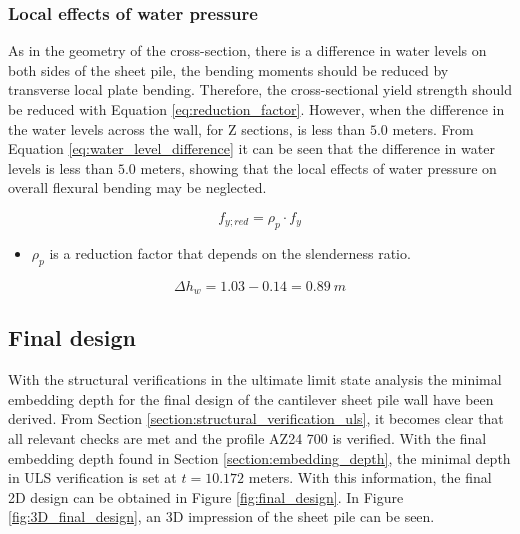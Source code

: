 \subsubsection{Local effects of water pressure}

As in the geometry of the cross-section, there is a difference in water levels on both sides of the sheet pile, the bending moments should be reduced by transverse local plate bending. Therefore, the cross-sectional yield strength should be reduced with Equation \ref{eq:reduction_factor}. However, when the difference in the water levels across the wall, for Z sections, is less than $5.0$ meters. From Equation \ref{eq:water_level_difference} it can be seen that the difference in water levels is less than $5.0$ meters, showing that the local effects of water pressure on overall flexural bending may be neglected. 

\begin{equation}
    f_{y;red} = \rho_{p} \cdot f_{y}
    \label{eq:reduction_factor}
\end{equation}

\begin{itemize}
    \item $\rho_{p}$ is a reduction factor that depends on the slenderness ratio. 
\end{itemize}

\begin{equation}
    \Delta h_w = 1.03 - 0.14 = 0.89 \ m
    \label{eq:water_level_difference}
\end{equation}




\subsection{Final design}

With the structural verifications in the ultimate limit state analysis the minimal embedding depth for the final design of the cantilever sheet pile wall have been derived. From Section \ref{section:structural_verification_uls}, it becomes clear that all relevant checks are met and the profile AZ24 700 is verified. With the final embedding depth found in Section \ref{section:embedding_depth}, the minimal depth in ULS verification is set at $t = 10.172$ meters. With this information, the final 2D design can be obtained in Figure \ref{fig:final_design}. In Figure \ref{fig:3D_final_design}, an 3D impression of the sheet pile can be seen.

